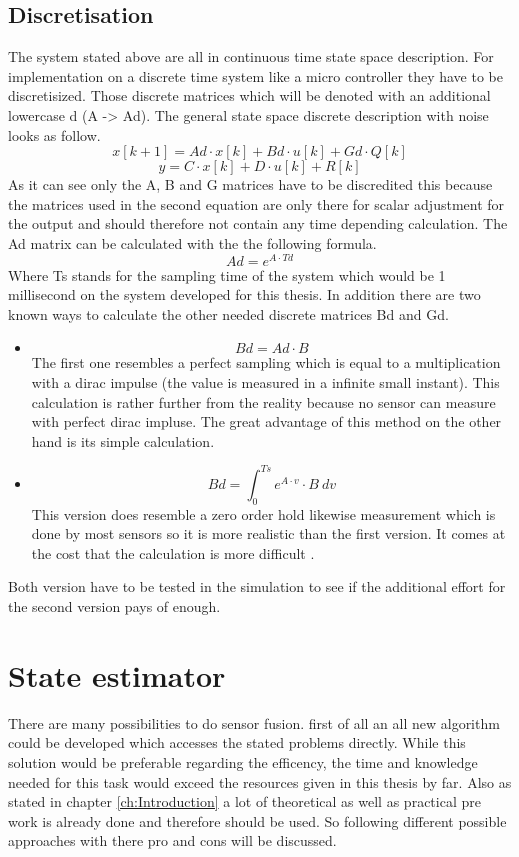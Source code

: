   \subsection{Discretisation}
  The system stated above are all in continuous time state space description. 
  For implementation on a discrete time system like a micro controller they have to be discretisized.
  Those discrete matrices which will be denoted with an additional lowercase d (A -> Ad).
  The general state space discrete description with noise looks as follow.
  $$ x[k+1] = Ad\cdot x[k] + Bd\cdot u[k] + Gd\cdot Q[k] $$
  $$ y = C \cdot x[k] + D\cdot u[k] + R[k] $$
  As it can see only the A, B and G matrices have to be discredited this because 
  the matrices used in the second equation are only there for scalar adjustment for the output
  and should therefore not contain any time depending calculation.
  The Ad matrix can be calculated with the the following formula.
  $$ Ad = e^{A\cdot Td}$$
  Where Ts stands for the sampling time of the system which would be 1 millisecond on the system developed for this thesis.
  In addition there are two known ways to calculate the other needed discrete matrices Bd and Gd.
  \begin{itemize}
   \item $$ Bd = Ad \cdot B $$
	 The first one resembles a perfect sampling which is equal to a multiplication with a dirac impulse (the value is measured in a infinite small instant).
	 This calculation is rather further from the reality because no sensor can measure with perfect dirac impluse.
	 The great advantage of this method on the other hand is its simple calculation.
   \item $$ Bd = \int_0^{Ts} e^{A\cdot v}\cdot B \ dv $$
	 This version does resemble a zero order hold likewise measurement which is done by most sensors so it is more realistic than the first version.
	 It comes at the cost that the calculation is more difficult \cite{DavidWSchultz2004}.
  \end{itemize}

  Both version have to be tested in the simulation to see if the additional effort for the second version pays of enough.
  
  \section{State estimator}
  There are many possibilities to do sensor fusion. first of all an all new algorithm could be developed which accesses the 
  stated problems directly. While this solution would be preferable regarding the efficency, the 
  time and knowledge needed for this task would exceed the resources given in this thesis by far.
  Also as stated in chapter \ref{ch:Introduction} a lot of theoretical as well as practical pre work is
  already done and therefore should be used. 
  So following different possible approaches with there pro and cons will be discussed. 
  

